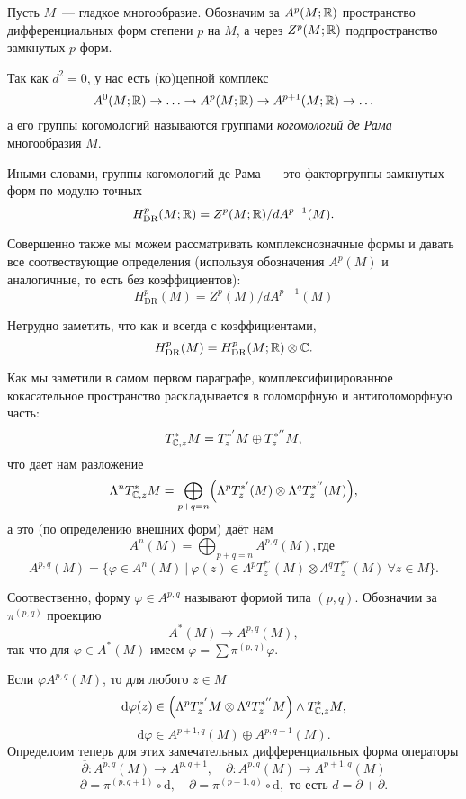     Пусть $M$~--- гладкое многообразие. Обозначим за $A^{p}(M; \R)$
    пространство дифференциальных форм степени $p$ на $M$, а через $Z^{p}(M; \R)$
    подпространство замкнутых $p$-форм.

    Так как $d^2 = 0$, у нас есть (ко)цепной комплекс
    \[ A^{0}(M; \R) \to \ldots \to A^{p}(M; \R) \to A^{p + 1}(M; \R) \to \ldots \]
    а его группы когомологий называются группами \emph{когомологий де Рама} многообразия $M$.

    Иными словами, группы когомологий де Рама~--- это факторгруппы замкнутых форм по модулю точных
    \[ H_{\textrm{DR}}^{p}(M; \R)  = Z^{p}(M; \R) / d A^{p - 1}(M). \]

    Совершенно также мы можем рассматривать комплекснозначные формы и давать все соотвествующие определения (используя обозначения $ A^{p}(M)$ и аналогичные, то
    есть без коэффициентов):
    \[ H_{\mathrm{DR}}^{p}(M) = Z^{p}(M)/d A^{p - 1}(M) \]

    \begin{remark}
       Нетрудно заметить, что как и всегда с коэффициентами,
        \[ H^{p}_{\mathrm{DR}}(M) = H_{\mathrm{DR}}^{p}(M; \R) \otimes \C. \]
    \end{remark}

    Как мы заметили в самом первом параграфе, комплексифицированное кокасательное пространство раскладывается в голоморфную и антиголоморфную часть:
    \[ T^{*}_{\C, z}M = T_{z}^{*'} M \oplus T_{z}^{*''} M,  \]
    что дает нам разложение
    \[ \Lambda^n T^{*}_{\C, z}M = \bigoplus_{p + q = n}\lr*{ \Lambda^{p} T^{*'}_{z}(M) \otimes \Lambda^{q} T_{z}^{*''}(M)}, \]
    а это (по определению внешних форм) даёт нам
    \[ A^{n}(M) = \bigoplus_{p + q = n} A^{p, q}(M), \text{где }\]
    \[ A^{p, q}(M) = \{ \varphi \in A^{n}(M) \ \vert \ \varphi(z) \in \Lambda^{p}T_{z}^{*'}(M) \otimes \Lambda^q T_{z}^{*''}(M) \ \forall z \in M \}. \]

    Соотвественно, форму $\varphi \in A^{p, q}$ называют формой типа $(p, q)$. Обозначим за $\pi^{(p, q)}$ проекцию
    \[ A^{*}(M) \to A^{p, q}(M), \]
    так что для $\varphi \in A^{*}(M)$ имеем $\varphi = \sum \pi^{(p, q)}\varphi$.

    Если $\varphi A^{p, q}(M)$, то для любого $z \in M$
    \[ \mathrm{d}\varphi(z) \in \lr*{\Lambda^{p} T_{z}^{*'}M \otimes \Lambda^{q} T^{*''}_{z}M} \wedge T^{*}_{\C, z}M, \]
    \[ \mathrm{d}\varphi \in A^{p + 1, q}(M) \oplus A^{p, q + 1}(M). \]
    Определоим теперь для этих замечательных дифференциальных форма операторы
    \[ \overline{\partial}\colon A^{p, q}(M) \to A^{p, q + 1}, \quad \partial \colon A^{p, q}(M) \to A^{p + 1, q}(M) \]
    \[ \overline{\partial} = \pi^{(p, q + 1)} \circ \mathrm{d}, \quad \partial = \pi^{(p + 1, q)} \circ \mathrm{d}, \text{ то есть } d = \partial + \overline{\partial}. \]

